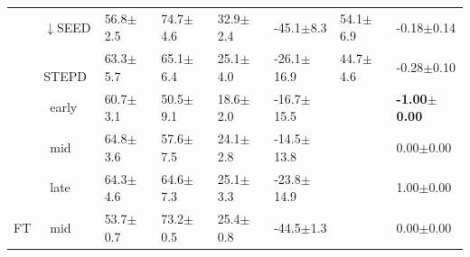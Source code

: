 \begin{tabular}{llllllll}
 & $\downarrow$SEED & 56.8\tiny{$\pm$2.5} & 74.7\tiny{$\pm$4.6} & 32.9\tiny{$\pm$2.4} & -45.1\tiny{$\pm$8.3} & 54.1\tiny{$\pm$6.9} & -0.18\tiny{$\pm$0.14} \\
 & $\ \;$STEPD & 63.3\tiny{$\pm$5.7} & 65.1\tiny{$\pm$6.4} & 25.1\tiny{$\pm$4.0} & -26.1\tiny{$\pm$16.9} & 44.7\tiny{$\pm$4.6} & -0.28\tiny{$\pm$0.10} \\
 & $\ \;$early & 60.7\tiny{$\pm$3.1} & 50.5\tiny{$\pm$9.1} & 18.6\tiny{$\pm$2.0} & -16.7\tiny{$\pm$15.5} &  & \textbf{-1.00\tiny{$\pm$0.00}} \\
 & $\ \;$mid & 64.8\tiny{$\pm$3.6} & 57.6\tiny{$\pm$7.5} & 24.1\tiny{$\pm$2.8} & -14.5\tiny{$\pm$13.8} &  & 0.00\tiny{$\pm$0.00} \\
 & $\ \;$late & 64.3\tiny{$\pm$4.6} & 64.6\tiny{$\pm$7.3} & 25.1\tiny{$\pm$3.3} & -23.8\tiny{$\pm$14.9} &  & 1.00\tiny{$\pm$0.00} \\
\midrule
FT & $\ \;$mid & 53.7\tiny{$\pm$0.7} & 73.2\tiny{$\pm$0.5} & 25.4\tiny{$\pm$0.8} & -44.5\tiny{$\pm$1.3} &  & 0.00\tiny{$\pm$0.00} \\
\bottomrule
\end{tabular}
